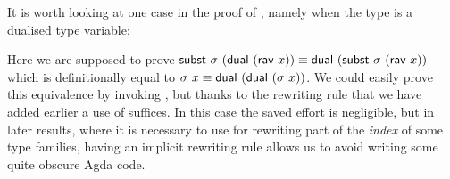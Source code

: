 It is worth looking at one case in the proof of ,
namely when the type is a dualised type variable:

\begin{code}%
\>[0]\AgdaSpace{}%
\AgdaSymbol{\{\AgdaUnderscore{}\}}\AgdaSpace{}%
\AgdaSymbol{\{\AgdaUnderscore{}\}}\AgdaSpace{}%
\AgdaSymbol{\{}\AgdaSymbol{\}}\AgdaSpace{}%
\AgdaSymbol{\{}\AgdaSpace{}%
\AgdaSymbol{\}}\AgdaSpace{}%
\AgdaSymbol{=}\AgdaSpace{}%
\<%
\end{code}

Here we are supposed to prove
$\AgdaFunction{subst}~\sigma~(\AgdaFunction{dual}~(\AgdaInductiveConstructor{rav}~x))
  \equiv
  \AgdaFunction{dual}~(\AgdaFunction{subst}~\sigma~(\AgdaInductiveConstructor{rav}~x))$
  which is definitionally equal to $\sigma~x \equiv
  \AgdaFunction{dual}~(\AgdaFunction{dual}~(\sigma~x))$.
%
We could easily prove this equivalence by invoking , but
thanks to the rewriting rule that we have added earlier a use of
 suffices. In this case the saved effort is
negligible, but in later results, where it is necessary to use
 for rewriting part of the \emph{index} of some type
families, having an implicit rewriting rule allows us to avoid writing some
quite obscure Agda code.

